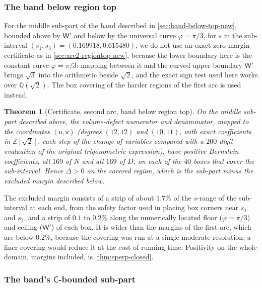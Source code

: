 \documentclass[11pt,reqno]{amsart}
\renewcommand{\_}{\origunderscore\allowbreak}
\numberwithin{equation}{section}
\theoremstyle{plain}
\newtheorem{thm}{Theorem}[section]
\theoremstyle{definition}
\theoremstyle{remark}
\newcommand{\tilt}{\varphi}                  %
\newcommand{\arcp}{s}                        %
\newcommand{\defect}{\Delta}                 %
\begin{document}
\subsubsection{The band below region top}\label{sec:arc2-band-cert-new}

For the middle sub-part of the band described in
\cref{sec:band-below-top-new}, bounded above by $\mathsf W'$ and below
by the universal curve $\tilt=\pi/3$, for $\arcp$ in the sub-interval
$(\arcp_1,\arcp_3)=(0.169918,0.615480)$, we do not use an exact
zero-margin certificate as in \cref{sec:arc2-regiontop-new}, because the
lower boundary here is the constant curve
$\tilt=\pi/3$: mapping between it and the curved upper boundary
$\mathsf W'$ brings $\sqrt3$ into the arithmetic beside $\sqrt2$, and the
exact sign test used here works over $\mathbb{Q}(\sqrt2)$. The box
covering of the harder regions of the first arc is used instead.

\begin{thm}[Certificate, second arc, band below region top]\label{thm:arc2-band-new}
On the middle sub-part described above, the volume-defect numerator and
denominator, mapped to the coordinates $(\mathsf u,\mathsf v)$
(degrees $(12,12)$ and $(10,11)$, with exact coefficients in
$\mathbb{Z}[\sqrt2]$, each step of the change of variables compared with
a $200$-digit evaluation of the original trigonometric expression), have
positive Bernstein coefficients, all $169$ of $N$ and all $169$ of $D$,
on each of the $40$ boxes that cover the sub-interval. Hence $\defect>0$ on the covered region, which is the
sub-part minus the excluded margin described below.
\end{thm}

The excluded margin consists of a strip of about $1.7\%$ of the
$\arcp$-range of the sub-interval at each end, from the safety factor
used in placing box corners near $\arcp_1$ and $\arcp_3$, and a strip
of $0.1$ to $0.2\%$ along the numerically located floor ($\tilt=\pi/3$)
and ceiling ($\mathsf W'$) of each box. It is wider than the margins of
the first arc, which are below $0.2\%$, because the covering was run at
a single moderate resolution; a finer covering would reduce it at the
cost of running time. Positivity on the whole domain, margins
included, is \cref{thm:eperp-closed}.

\subsubsection{The band's \texorpdfstring{$\mathsf C$}{C}-bounded sub-part}\label{sec:arc2-bandC-new}
\end{document}
